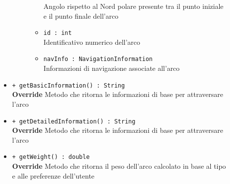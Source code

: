\documentclass[../DefinizioneDiProdotto.tex]{subfiles}
\begin{document}
\begin{description}
\begin{itemize}
\begin{description}
\begin{itemize}
				Angolo rispetto al Nord polare presente tra il punto iniziale e il punto finale dell'arco\item \texttt{id : int}\\
				Identificativo numerico dell'arco\item \texttt{navInfo : NavigationInformation}\\
				Informazioni di navigazione associate all'arco\end{itemize}
		\end{description}
		\item \texttt{+ getBasicInformation() : String}\\
		\textbf{Override} Metodo che ritorna le informazioni di base per attraversare l'arco
		\item \texttt{+ getDetailedInformation() : String}\\
		\textbf{Override} Metodo che ritorna le informazioni di base per attraversare l'arco
		\item \texttt{+ getWeight() : double}\\
		\textbf{Override} Metodo che ritorna il peso dell'arco calcolato in base al tipo e alle preferenze dell'utente
	\end{itemize}
\end{description}
\end{document}
